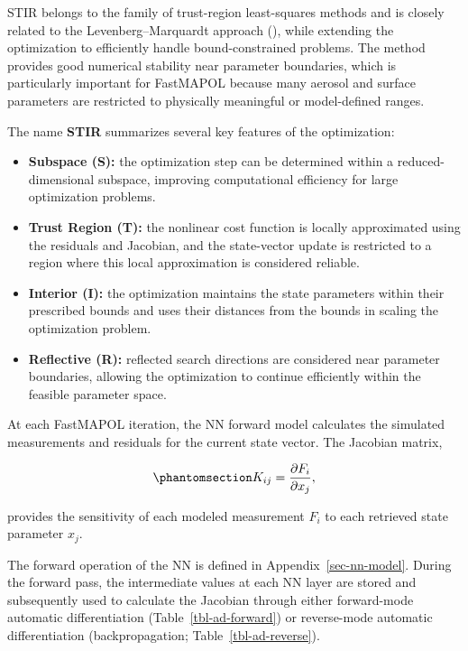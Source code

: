 \documentclass[
  11pt,
  letterpaper,
]{scrreprt}
\providecommand{\tightlist}{%
  \setlength{\itemsep}{0pt}\setlength{\parskip}{0pt}}
\begin{document}
STIR belongs to the family of trust-region least-squares methods and is
closely related to the Levenberg--Marquardt approach
(), while extending the
optimization to efficiently handle bound-constrained problems. The
method provides good numerical stability near parameter boundaries,
which is particularly important for FastMAPOL because many aerosol and
surface parameters are restricted to physically meaningful or
model-defined ranges.

The name \textbf{STIR} summarizes several key features of the
optimization:

\begin{itemize}
\tightlist
\item
  \textbf{Subspace (S):} the optimization step can be determined within
  a reduced-dimensional subspace, improving computational efficiency for
  large optimization problems.
\item
  \textbf{Trust Region (T):} the nonlinear cost function is locally
  approximated using the residuals and Jacobian, and the state-vector
  update is restricted to a region where this local approximation is
  considered reliable.
\item
  \textbf{Interior (I):} the optimization maintains the state parameters
  within their prescribed bounds and uses their distances from the
  bounds in scaling the optimization problem.
\item
  \textbf{Reflective (R):} reflected search directions are considered
  near parameter boundaries, allowing the optimization to continue
  efficiently within the feasible parameter space.
\end{itemize}

At each FastMAPOL iteration, the NN forward model calculates the
simulated measurements and residuals for the current state vector. The
Jacobian matrix,

\begin{equation}\phantomsection\label{eq-retrieval-jacobian}{
K_{ij}
=
\frac{\partial F_i}{\partial x_j},
}\end{equation}

provides the sensitivity of each modeled measurement \(F_i\) to each
retrieved state parameter \(x_j\).

The forward operation of the NN is defined in
Appendix~\ref{sec-nn-model}. During the forward pass, the intermediate
values at each NN layer are stored and subsequently used to calculate
the Jacobian through either forward-mode automatic differentiation
(Table~\ref{tbl-ad-forward}) or reverse-mode automatic differentiation
(backpropagation; Table~\ref{tbl-ad-reverse}).
\end{document}
